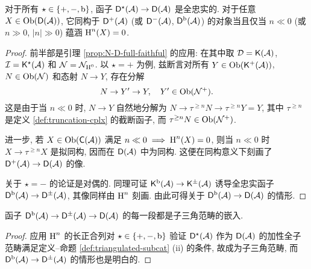 \begin{proposition}\label{prop:derived-full-faithful-subcat}
	对于所有 $\star \in \{+, -, \mathrm{b}\}$, 函子 $\mathsf{D}^{\star}(\mathcal{A}) \to \mathsf{D}(\mathcal{A})$ 是全忠实的. 对于任意 $X \in \operatorname{Ob}(\mathsf{D}(\mathcal{A}))$, 它同构于 $\mathsf{D}^{+}(\mathcal{A})$ (或 $\mathsf{D}^{-}(\mathcal{A})$, $\mathsf{D}^{\mathrm{b}}(\mathcal{A})$) 的对象当且仅当 $n \ll 0$ (或 $n \gg 0$, $|n| \gg 0$) 蕴涵 $\operatorname{H}^n(X) = 0$.
\end{proposition}
\begin{proof}
	前半部是引理 \ref{prop:N-D-full-faithful} 的应用: 在其中取 $\mathcal{D} = \mathsf{K}(\mathcal{A})$, $\mathcal{I} = \mathsf{K}^\star(\mathcal{A})$ 和 $\mathcal{N} = \mathcal{N}_{\operatorname{H}^0}$. 以 $\star = +$ 为例, 兹断言对所有 $Y \in \operatorname{Ob}(\mathsf{K}^+(\mathcal{A}))$, $N \in \operatorname{Ob}(\mathcal{N})$ 和态射 $N \to Y$, 存在分解
	\[ N \to Y' \to Y, \quad Y' \in \operatorname{Ob}(\mathcal{N}^+). \]
	这是由于当 $n \ll 0$ 时, $N \to Y$ 自然地分解为 $N \to \tau^{\geq n} N \to \tau^{\geq n} Y = Y$, 其中 $\tau^{\geq n}$ 是定义 \ref{def:truncation-cplx} 的截断函子, 而 $\tau^{\geq n} N \in \operatorname{Ob}(\mathcal{N}^+)$.

	进一步, 若 $X \in \operatorname{Ob}(\mathsf{C}(\mathcal{A}))$ 满足 $n \ll 0 \implies \operatorname{H}^n(X) = 0$, 则当 $n \ll 0$ 时 $X \to \tau^{\geq n} X$ 是拟同构, 因而在 $\mathsf{D}(\mathcal{A})$ 中为同构. 这便在同构意义下刻画了 $\mathsf{D}^+(\mathcal{A}) \to \mathsf{D}(\mathcal{A})$ 的像.
	
	关于 $\star = -$ 的论证是对偶的. 同理可证 $\mathsf{K}^{\mathrm{b}}(\mathcal{A}) \to \mathsf{K}^\pm(\mathcal{A})$ 诱导全忠实函子 $\mathsf{D}^{\mathrm{b}}(\mathcal{A}) \to \mathsf{D}^\pm(\mathcal{A})$, 其像同样由 $\operatorname{H}^n$ 刻画. 由此可得关于 $\mathsf{D}^{\mathrm{b}}(\mathcal{A}) \to \mathsf{D}(\mathcal{A})$ 的情形.
\end{proof}

\begin{corollary}
	函子 $\mathsf{D}^{\mathrm{b}}(\mathcal{A}) \to \mathsf{D}^{\pm}(\mathcal{A}) \to \mathsf{D}(\mathcal{A})$ 的每一段都是子三角范畴的嵌入.
\end{corollary}
\begin{proof}
	应用 $\operatorname{H}^n$ 的长正合列对 $\star \in \{+, -, \mathrm{b}\}$ 验证 $\mathsf{D}^\star(\mathcal{A})$ 作为 $\mathsf{D}(\mathcal{A})$ 的加性全子范畴满足定义--命题 \ref{def:triangulated-subcat} (ii) 的条件, 故成为子三角范畴, 而 $\mathsf{D}^{\mathrm{b}}(\mathcal{A}) \to \mathsf{D}^{\pm}(\mathcal{A})$ 的情形也是明白的.
\end{proof}

